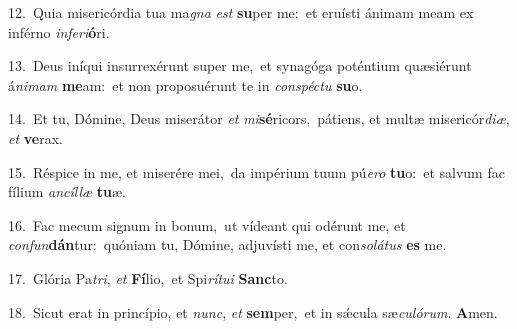 {\numbfont\textcolor{\numbcolor}{12.}}~Quia misericórdia tua ma\textit{gna} \textit{est} \textbf{su}\-per me:~\star et eruísti ánimam meam ex inférno \textit{in}\-\textit{fe}\textit{ri}\textbf{ó}ri.\par
{\numbfont\textcolor{\numbcolor}{13.}}~Deus iníqui insurrexérunt super me,~\dagger et synagóga poténtium quæsiérunt á\-\textit{ni}\-\textit{mam} \textbf{me}\-am:~\star et non proposuérunt te in \textit{con}\-\textit{spéc}\textit{tu} \textbf{su}\-o.\par
{\numbfont\textcolor{\numbcolor}{14.}}~Et tu, Dómine, Deus miserátor \textit{et} \textit{mi}\-\textbf{sé}ricors,~\star pátiens, et multæ misericór\-\textit{di}\-\textit{æ}, \textit{et} \textbf{ve}\-rax.\par
{\numbfont\textcolor{\numbcolor}{15.}}~Réspice in me, et miserére mei,~\dagger da impérium tuum pú\-\textit{e}\-\textit{ro} \textbf{tu}\-o:~\star et salvum fac fílium \textit{an}\-\textit{cíl}\textit{læ} \textbf{tu}\-æ.\par
{\numbfont\textcolor{\numbcolor}{16.}}~Fac mecum signum in bonum,~\dagger ut vídeant qui odérunt me, et \textit{con}\-\textit{fun}\textbf{dán}tur:~\star quóniam tu, Dómine, adjuvísti me, et con\-\textit{so}\-\textit{lá}\textit{tus} \textbf{es} me.\par
{\numbfont\textcolor{\numbcolor}{17.}}~Glória Pa\-\textit{tri}\-, \textit{et} \textbf{Fí}\-lio,~\star et Spi\-\textit{rí}\-\textit{tu}\textit{i} \textbf{Sanc}\-to.\par
{\numbfont\textcolor{\numbcolor}{18.}}~Sicut erat in princípio, et \textit{nunc}\-, \textit{et} \textbf{sem}\-per,~\star et in sǽcula sæ\-\textit{cu}\-\textit{ló}\textit{rum}. \textbf{A}\-men.\par
